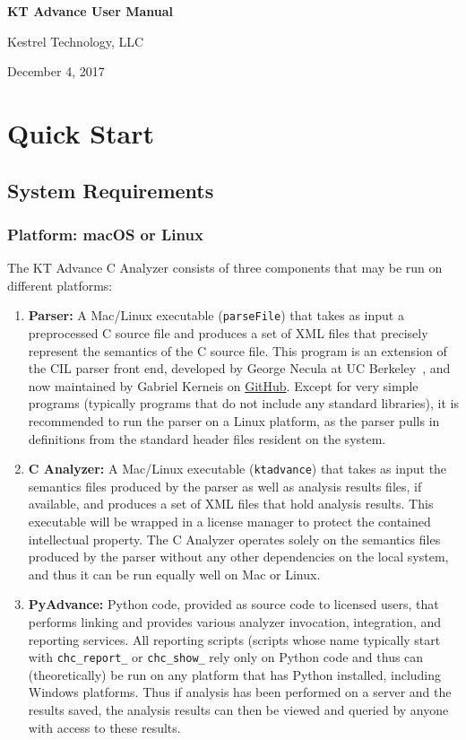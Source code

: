 \documentclass[11pt]{article}
\begin{document}
\vfill
\vfill


{\Large\bf{
KT Advance User Manual}}

\vfill

{\Large{Kestrel Technology, LLC}}

\bigskip

December 4, 2017

\vfill
\vfill
\vfill

\newpage
\tableofcontents
\newpage

\section{Quick Start}

\subsection{System Requirements}

\subsubsection{Platform: macOS or Linux}

The KT Advance C Analyzer consists of three components that may be run on
different platforms:
\begin{enumerate}
\item {\bf Parser:} A Mac/Linux executable ({\tt parseFile}) that takes as input a preprocessed
C source file and produces a set of XML files that precisely represent the
semantics of the C source file. This program is an extension of the CIL
parser front end, developed by George Necula at UC 
Berkeley~\cite{DBLP:conf/cc/NeculaMRW02}, and now maintained by Gabriel Kerneis 
on \href{https://github.com/cil-project/cil}{GitHub}. Except for very simple programs (typically programs that do
not include any standard libraries), it is recommended to run the parser on
a Linux platform, as the parser pulls in definitions from the standard header files
resident on the system.
\item {\bf C Analyzer:} A Mac/Linux executable ({\tt ktadvance}) that takes as input the
semantics files produced by the parser as well as analysis results files, if available, 
and produces a set of XML files that hold analysis results. This executable
will be wrapped in a license manager to protect the contained 
intellectual property. The C Analyzer operates solely on the semantics files produced
by the parser without any other dependencies on the local system, and thus it can be
run equally well on Mac or Linux.
\item {\bf PyAdvance:} Python code, provided as source code to licensed
users, that performs linking and provides various analyzer invocation, 
integration, and reporting services. All reporting scripts (scripts whose name typically
start with {\tt chc\_report\_} or {\tt chc\_show\_} rely only on Python code and thus
can (theoretically) be run on any platform that has Python installed, including Windows
platforms. Thus if analysis has been performed on a server and the results saved, the 
analysis results can then be viewed and queried by anyone with access to these results.
\end{enumerate}
\end{document}
